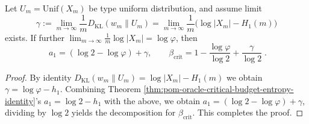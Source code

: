 \begin{theorem}\label{thm:pom-oracle-critical-budget-zeckendorf-plus-gap}
Let \(U_m=\mathrm{Unif}(X_m)\) be type uniform distribution, and assume limit
\[
\gamma:=\lim_{m\to\infty}\frac{1}{m}D_{\mathrm{KL}}(w_m\|U_m)
=\lim_{m\to\infty}\frac{1}{m}\bigl(\log|X_m|-H_1(m)\bigr)
\]
exists.
If further \(\lim_{m\to\infty}\frac{1}{m}\log|X_m|=\log\varphi\), then
\[
\boxed{\;
a_1=(\log 2-\log\varphi)+\gamma,\qquad
\beta_{\mathrm{crit}}=1-\frac{\log\varphi}{\log 2}+\frac{\gamma}{\log 2}\; } .
\]
\end{theorem}
\begin{proof}
By identity \(D_{\mathrm{KL}}(w_m\|U_m)=\log|X_m|-H_1(m)\) we obtain
\(
\gamma=\log\varphi-h_1
\).
Combining Theorem \ref{thm:pom-oracle-critical-budget-entropy-identity}'s \(a_1=\log 2-h_1\) with the above,
we obtain \(a_1=(\log 2-\log\varphi)+\gamma\), dividing by \(\log 2\) yields the decomposition for \(\beta_{\mathrm{crit}}\). This completes the proof.
\end{proof}
\endinput




